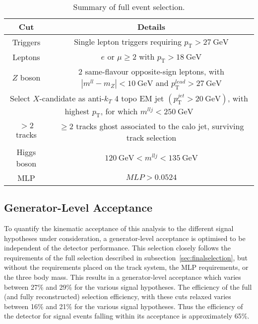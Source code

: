 \documentclass[NOTE, atlasdraft=true, texlive=2017, UKenglish]{\ATLASLATEXPATH atlasdoc}
\begin{document}
\begin{table}[!htbp]{\footnotesize\renewcommand{\arraystretch}{1.2}
    \begin{center}
      \begin{tabular}{|c|c|}
        \hline
        Cut & Details \\
        \hline
        Triggers & Single lepton triggers requiring $p_\text{T}>27\ \text{GeV}$ \\
        Leptons & $e\text{ or }\mu\geq 2$ with $p_\text{T}>18\ \text{GeV}$ \\
        $Z$ boson & 2 same-flavour opposite-sign leptons, with $|m^{ll}-m_Z|<10\ \text{GeV}$ and $p_\text{T}^{lead}>27\ \text{GeV}$ \\
        \hline
        \multicolumn{2}{|c|}{Select $X$-candidate as anti-$k_T$ 4 topo EM jet $(p_\text{T}^{jet}>20\ \text{GeV})$, with highest $p_\text{T}$, for which $m^{llj}<250\ \text{GeV}$}\\
        \hline
        $>2$ tracks & $\geq 2$ tracks ghost associated to the calo jet, surviving track selection \\
        Higgs boson & $120\ \text{GeV}<m^{llj}<135\ \text{GeV}$ \\
        MLP & $MLP>0.0524$ \\
        \hline
      \end{tabular}
      \caption{Summary of full event selection.}
      \label{tab:selection}
  \end{center}}
\end{table}


\subsection{Generator-Level Acceptance}
\label{sec:truthacceptance}

To quantify the kinematic acceptance of this analysis to the different signal hypotheses under consideration, a generator-level acceptance is optimised to be independent of the detector performance. This selection closely follows the requirements of the full selection described in subsection~\ref{sec:finalselection}, but without the requirements placed on the track system, the MLP requirements, or the three body mass. This results in a generator-level acceptance which varies between 27\% and 29\% for the various signal hypotheses. The efficiency of the full (and fully reconstructed) selection efficiency, with these cuts relaxed varies between 16\% and 21\% for the various signal hypotheses. Thus the efficiency of the detector for signal events falling within its acceptance is approximately 65\%.
\end{document}
